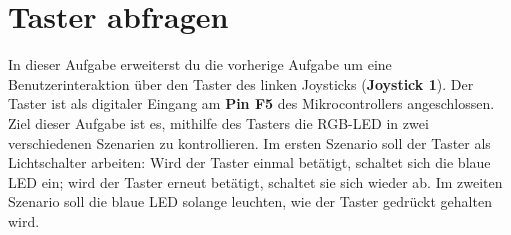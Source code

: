 \section{\ExercisePrefixEmbeddedC Taster abfragen \optional}

In dieser Aufgabe erweiterst du die vorherige Aufgabe um eine Benutzerinteraktion über den Taster des linken Joysticks (\textbf{Joystick 1}).
Der Taster ist als digitaler Eingang am \textbf{Pin F5} des Mikrocontrollers angeschlossen.
Ziel dieser Aufgabe ist es, mithilfe des Tasters die RGB-LED in zwei verschiedenen Szenarien zu kontrollieren.
Im ersten Szenario soll der Taster als Lichtschalter arbeiten: Wird der Taster einmal betätigt, schaltet sich die blaue LED ein; wird der Taster erneut betätigt, schaltet sie sich wieder ab.
Im zweiten Szenario soll die blaue LED solange leuchten, wie der Taster gedrückt gehalten wird.

